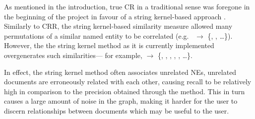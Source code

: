 As mentioned in the introduction, true CR in a traditional sense was foregone in the beginning of the project in favour of a string kernel-based approach . Similarly to CRR, the string kernel-based similarity measure allowed many permutations of a similar named entity to be correlated (e.g.\ \textbf{} $\rightarrow$ \{, ,  \ldots\}). However, the the string kernel method as it is currently implemented overgenerates such similarities--- for example, \textbf{} $\rightarrow$ \{, , , , ,  \ldots\}.

In effect, the string kernel method often associates unrelated NEs, unrelated documents are erroneously related with each other, causing recall to be relatively high in comparison to the precision obtained through the method. This in turn causes a large amount of noise in the graph, making it harder for the user to discern relationships between documents which may be useful to the user.